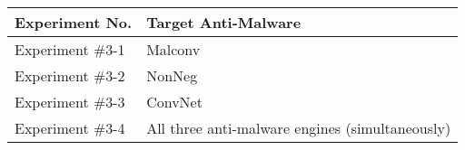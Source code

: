\begin{tabularx}{1\textwidth} { 
  | >{\raggedright\arraybackslash}X 
  | >{\raggedright\arraybackslash}X | }
 \hline
 Experiment No. & Target Anti-Malware \\ [0.5ex] 
 \hline
 Experiment \#3-1 & Malconv \\ 
 \hline
 Experiment \#3-2 & NonNeg \\ 
 \hline
 Experiment \#3-3 & ConvNet \\ 
 \hline
 Experiment \#3-4 & All three anti-malware engines (simultaneously) \\ 
 \hline
\end{tabularx}